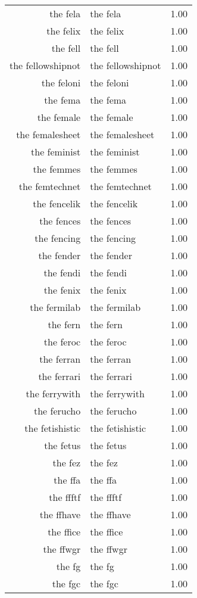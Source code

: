 \begin{table}[ht]
\begin{tabular}{rlr}
  the fela & the fela & 1.00 \\ 
  the felix & the felix & 1.00 \\ 
  the fell & the fell & 1.00 \\ 
  the fellowshipnot & the fellowshipnot & 1.00 \\ 
  the feloni & the feloni & 1.00 \\ 
  the fema & the fema & 1.00 \\ 
  the female & the female & 1.00 \\ 
  the femalesheet & the femalesheet & 1.00 \\ 
  the feminist & the feminist & 1.00 \\ 
  the femmes & the femmes & 1.00 \\ 
  the femtechnet & the femtechnet & 1.00 \\ 
  the fencelik & the fencelik & 1.00 \\ 
  the fences & the fences & 1.00 \\ 
  the fencing & the fencing & 1.00 \\ 
  the fender & the fender & 1.00 \\ 
  the fendi & the fendi & 1.00 \\ 
  the fenix & the fenix & 1.00 \\ 
  the fermilab & the fermilab & 1.00 \\ 
  the fern & the fern & 1.00 \\ 
  the feroc & the feroc & 1.00 \\ 
  the ferran & the ferran & 1.00 \\ 
  the ferrari & the ferrari & 1.00 \\ 
  the ferrywith & the ferrywith & 1.00 \\ 
  the ferucho & the ferucho & 1.00 \\ 
  the fetishistic & the fetishistic & 1.00 \\ 
  the fetus & the fetus & 1.00 \\ 
  the fez & the fez & 1.00 \\ 
  the ffa & the ffa & 1.00 \\ 
  the ffftf & the ffftf & 1.00 \\ 
  the ffhave & the ffhave & 1.00 \\ 
  the ffice & the ffice & 1.00 \\ 
  the ffwgr & the ffwgr & 1.00 \\ 
  the fg & the fg & 1.00 \\ 
  the fgc & the fgc & 1.00 \\ 

\end{tabular}
\end{table}
